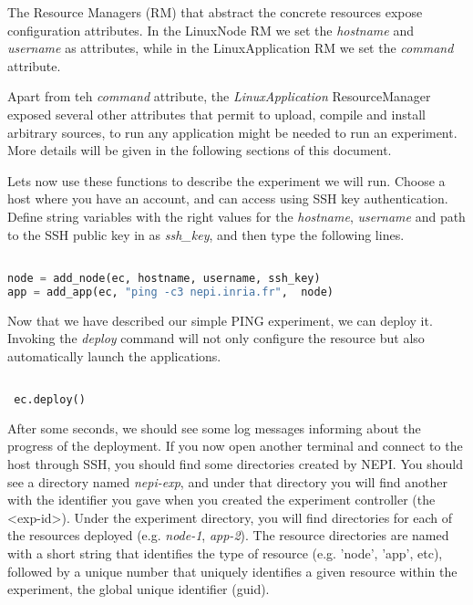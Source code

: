 The Resource Managers (RM) that abstract the concrete resources expose
configuration attributes. In the LinuxNode RM we set the \emph{hostname} 
and \emph{username} as attributes, while in the LinuxApplication RM 
we set the \emph{command} attribute.

Apart from teh \emph{command} attribute, the \emph{LinuxApplication} 
ResourceManager exposed several other attributes
that permit to upload, compile and install arbitrary sources, 
to run any application might be needed to run an experiment. 
More details will be given in the following sections of this document.

Lets now use these functions to describe the experiment we will run. 
Choose a host where you have an account, and can access using SSH
key authentication. Define string variables with the right
values for the  \emph{hostname}, \emph{username} and path to the
SSH public key in as \emph{ssh\_key}, and then type the following lines.

\begin{lstlisting}[language=Python]

node = add_node(ec, hostname, username, ssh_key)
app = add_app(ec, "ping -c3 nepi.inria.fr",  node)

\end{lstlisting}

Now that we have described our simple PING experiment, we can deploy
it. Invoking the \emph{deploy} command will not only configure the 
resource but also automatically launch the applications.

\begin{lstlisting}[language=Python]

 ec.deploy()

\end{lstlisting}

After some seconds, we should see some log messages informing about 
the progress of the deployment.
If you now open another terminal and connect to the host through SSH, 
you should find some directories created by NEPI.
You should see a directory named \emph{nepi-exp}, and under that directory
you will find another with the identifier you gave when you created the 
experiment controller (the <exp-id>). 
Under the experiment directory, you will find directories for each of the 
resources deployed (e.g. \emph{node-1}, \emph{app-2}). 
The resource directories are named with a short string that identifies the
type of resource (e.g. 'node', 'app', etc), followed by a unique number that 
uniquely identifies a given resource within the experiment, 
the global unique identifier (guid).

